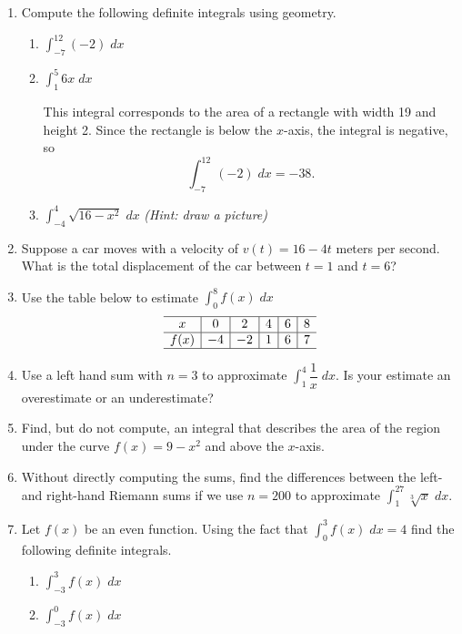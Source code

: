 \documentclass[11pt]{article}
\newcommand{\ds}{\displaystyle}
\begin{document}
\drawtitle

\begin{enumerate}
\item Compute the following definite integrals using geometry.
  \begin{enumerate}
  \item $\ds\int_{-7}^{12} (-2)\;dx$
   \vfill
  \item $\ds\int_1^5 6x \;dx$
    \vfill
    {\color{blue}
      
      This integral corresponds to the area of a rectangle with width
      19 and height 2. Since the rectangle is below the $x$-axis, the
      integral is negative, so
      \[
      \int_{-7}^{12} (-2)\;dx = -38.
      \]
     

    }
    \vfill
    \newpage
  \item $\ds\int_{-4}^4 \sqrt{16-x^2}\;dx$ \textit{(Hint: draw a picture)}
    \vfill
  \end{enumerate}

\item Suppose a car moves with a velocity of $v(t) = 16 - 4t$ meters
  per second.  What is the total displacement of the car between $t =
  1$ and $t = 6$?
  \vfill

  \newpage

\item Use the table below to estimate $\ds\int_0^{8} f(x)\;dx$
  \[
  \begin{array}{c|c|c|c|c|c}
    \hline
    x&0&2&4&6&8\\
    \hline
    f(x)&-4&-2&1&6&7\\
    \hline
  \end{array}
  \]

  \newpage

\item Use a left hand sum with $n=3$ to approximate
  $\ds\int_1^4\dfrac{1}{x}\;dx$.  Is your estimate an overestimate or
  an underestimate?

  \vfill

\item Find, but do not compute, an integral that describes the area of
  the region under the curve $f(x)=9-x^2$ and above the $x$-axis.

  \vfill

  \newpage

\item Without directly computing the sums, find the differences between
  the left- and right-hand Riemann sums if we use $n=200$ to
  approximate $\ds\int_1^{27}\sqrt[3]{x}\;dx$.

  \newpage

\item Let $f(x)$ be an even function.  Using the fact that
  $\ds\int_0^3 f(x)\;dx = 4$ find the following definite integrals.
  \begin{enumerate}
  \item $\ds\int_{-3}^3 f(x)\;dx$
    \vfill
  \item $\ds\int_{-3}^0 f(x)\;dx$
    \vfill
  \end{enumerate}

\end{enumerate}
\end{document}
